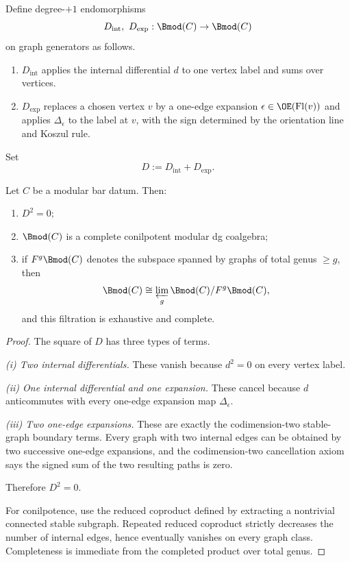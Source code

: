 \begin{definition}
Define degree-$+1$ endomorphisms
\[
D_{\mathrm{int}},\ D_{\mathrm{exp}}:\Bmod(C)\to \Bmod(C)
\]
on graph generators as follows.
\begin{enumerate}[leftmargin=2.4em]
\item $D_{\mathrm{int}}$ applies the internal differential $d$ to one vertex label and
sums over vertices.
\item $D_{\mathrm{exp}}$ replaces a chosen vertex $v$ by a one-edge expansion
$\epsilon\in \OE(\mathrm{Fl}(v))$ and applies $\Delta_\epsilon$ to the label at $v$,
with the sign determined by the orientation line and Koszul rule.
\end{enumerate}
Set
\[
D:=D_{\mathrm{int}}+D_{\mathrm{exp}}.
\]
\end{definition}

\begin{theorem}\label{thm:modular-bar}
Let $C$ be a modular bar datum. Then:
\begin{enumerate}[leftmargin=2.4em]
\item $D^2=0$;
\item $\Bmod(C)$ is a complete conilpotent modular dg coalgebra;
\item if $F^g\Bmod(C)$ denotes the subspace spanned by graphs of total genus $\ge g$, then
\[
\Bmod(C)\cong \varprojlim_g \Bmod(C)/F^g\Bmod(C),
\]
and this filtration is exhaustive and complete.
\end{enumerate}
\end{theorem}

\begin{proof}
The square of $D$ has three types of terms.

\smallskip
\noindent
\emph{(i) Two internal differentials.}
These vanish because $d^2=0$ on every vertex label.

\smallskip
\noindent
\emph{(ii) One internal differential and one expansion.}
These cancel because $d$ anticommutes with every one-edge expansion map $\Delta_\epsilon$.

\smallskip
\noindent
\emph{(iii) Two one-edge expansions.}
These are exactly the codimension-two stable-graph boundary terms. Every graph with two
internal edges can be obtained by two successive one-edge expansions, and the codimension-two
cancellation axiom says the signed sum of the two resulting paths is zero.

Therefore $D^2=0$.

For conilpotence, use the reduced coproduct defined by extracting a nontrivial connected
stable subgraph. Repeated reduced coproduct strictly decreases the number of internal
edges, hence eventually vanishes on every graph class. Completeness is immediate from
the completed product over total genus.
\end{proof}

